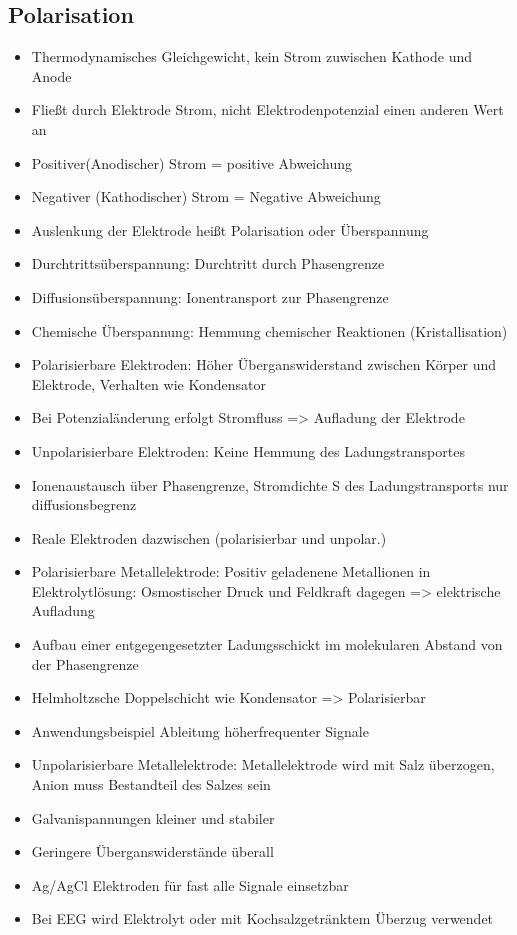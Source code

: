 \documentclass[a4paper,10pt,oneside]{article}
\begin{document}
\subsection{Polarisation}
\begin{itemize}
	\item Thermodynamisches Gleichgewicht, kein Strom zuwischen Kathode und Anode
	\item Fließt durch Elektrode Strom, nicht Elektrodenpotenzial einen anderen Wert an
	\item Positiver(Anodischer) Strom = positive Abweichung
	\item Negativer (Kathodischer) Strom = Negative Abweichung
	\item Auslenkung der Elektrode heißt Polarisation oder Überspannung
	\item Durchtrittsüberspannung: Durchtritt durch Phasengrenze
	\item Diffusionsüberspannung: Ionentransport zur Phasengrenze
	\item Chemische Überspannung: Hemmung chemischer Reaktionen (Kristallisation)
	\item Polarisierbare Elektroden: Höher Überganswiderstand zwischen Körper und Elektrode, Verhalten wie Kondensator
	\item Bei Potenzialänderung erfolgt Stromfluss => Aufladung der Elektrode
	\item Unpolarisierbare Elektroden: Keine Hemmung des Ladungstransportes
	\item Ionenaustausch über Phasengrenze, Stromdichte S des Ladungstransports nur diffusionsbegrenz
	\item Reale Elektroden dazwischen (polarisierbar und unpolar.)
	\item Polarisierbare Metallelektrode: Positiv geladenene Metallionen in Elektrolytlösung: Osmostischer Druck und Feldkraft dagegen => elektrische Aufladung
	\item Aufbau einer entgegengesetzter Ladungsschickt im molekularen Abstand von der Phasengrenze
	\item Helmholtzsche Doppelschicht wie Kondensator => Polarisierbar
	\item Anwendungsbeispiel Ableitung höherfrequenter Signale
	\item Unpolarisierbare Metallelektrode: Metallelektrode wird mit Salz überzogen, Anion muss Bestandteil des Salzes sein
	\item Galvanispannungen kleiner und stabiler
	\item Geringere Überganswiderstände überall
	\item Ag/AgCl Elektroden für fast alle Signale einsetzbar
	\item Bei EEG wird Elektrolyt oder mit Kochsalzgetränktem Überzug verwendet
\end{itemize}
\end{document}
